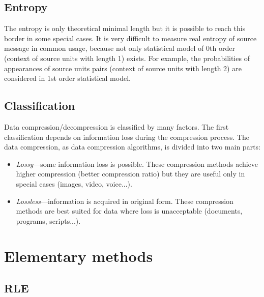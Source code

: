 \documentclass[thesis=M,english]{FITthesis}[2019/12/23]
\begin{document}
	\subsection{Entropy}
The entropy is only theoretical minimal length but it is possible to reach this border in some special cases. It is very difficult to measure real entropy of source message in common usage, because not only statistical model of 0th order (context of source units with length 1) exists. For example, the probabilities of appearances of source units pairs (context of source units with length 2) are considered in 1st order statistical model. 

	\subsection{Classification}

Data compression/decompression is classified by many factors. The first classification depends on information loss during the compression process. The data compression, as data compression algorithms, is divided into two main parts:
\begin{itemize}
	\item \textit{Lossy}---some information loss is possible. These compression methods achieve higher compression (better compression ratio) but they are useful only in special cases (images, video, voice...).
	\item \textit{Lossless}---information is acquired in original form. These compression methods are best suited for data where loss is unacceptable (documents, programs, scripts...).
\end{itemize}

\section{Elementary methods}


	\subsection{RLE}
\end{document}
